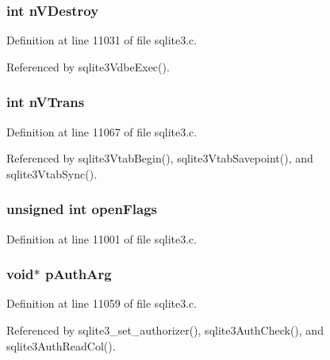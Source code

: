 \subsubsection[{n\+V\+Destroy}]{\setlength{\rightskip}{0pt plus 5cm}int n\+V\+Destroy}\label{structsqlite3_ac9a2a893dae0aec6a1db1311a095bcb8}


Definition at line 11031 of file sqlite3.\+c.



Referenced by sqlite3\+Vdbe\+Exec().

\hypertarget{structsqlite3_a0756d9e3351edc0a38d6e665d4d9cb59}{}
\subsubsection[{n\+V\+Trans}]{\setlength{\rightskip}{0pt plus 5cm}int n\+V\+Trans}\label{structsqlite3_a0756d9e3351edc0a38d6e665d4d9cb59}


Definition at line 11067 of file sqlite3.\+c.



Referenced by sqlite3\+Vtab\+Begin(), sqlite3\+Vtab\+Savepoint(), and sqlite3\+Vtab\+Sync().

\hypertarget{structsqlite3_a731ef3010094e378fcf5cfca43cb4f23}{}
\subsubsection[{open\+Flags}]{\setlength{\rightskip}{0pt plus 5cm}unsigned int open\+Flags}\label{structsqlite3_a731ef3010094e378fcf5cfca43cb4f23}


Definition at line 11001 of file sqlite3.\+c.

\hypertarget{structsqlite3_ad085401ecb9afe176038e13ce6386d5a}{}
\subsubsection[{p\+Auth\+Arg}]{\setlength{\rightskip}{0pt plus 5cm}void$\ast$ p\+Auth\+Arg}\label{structsqlite3_ad085401ecb9afe176038e13ce6386d5a}


Definition at line 11059 of file sqlite3.\+c.



Referenced by sqlite3\+\_\+set\+\_\+authorizer(), sqlite3\+Auth\+Check(), and sqlite3\+Auth\+Read\+Col().

